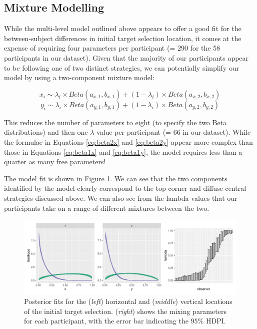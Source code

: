 \documentclass[preprints, article,submit,pdftex,moreauthors]{Definitions/mdpi}
\begin{document}
\subsection{Mixture Modelling}

While the multi-level model outlined above appears to offer a good fit for the between-subject differences in initial target selection location, it comes at the expense of requiring four parameters per participant (= 290 for the 58 participants in our dataset). Given that the majority of our participants appear to be following one of two distinct strategies, we can potentially simplify our model by using a two-component mixture model:

\begin{equation}
    x_i \sim \lambda_i \times Beta(a_{x,1}, b_{x,1}) + (1-\lambda_i) \times Beta(a_{x,2}, b_{x,2})
    \label{eq:beta2x}
\end{equation}
\begin{equation}
    y_i \sim \lambda_i \times Beta(a_{y,1}, b_{y,1}) + (1-\lambda_i) \times Beta(a_{y,2}, b_{y,2})
    \label{eq:beta2y}
\end{equation}

This reduces the number of parameters to eight (to specify the two Beta distributions) and then one $\lambda$ value per participant (= 66 in our dataset). While the formulae in Equations \ref{eq:beta2x} and \ref{eq:beta2y} appear more complex than those in Equations \ref{eq:beta1x} and \ref{eq:beta1y}, the model requires less than a quarter as many free parameters! 

The model fit is shown in Figure \ref{fig:qjep_init2_sel_mdl}. We can see that the two components identified by the model clearly correspond to the top corner and diffuse-central strategies discussed above. We can also see from the lambda values that our participants take on a range of different mixtures between the two. 

\begin{figure}[H]
\centering
\includegraphics[width=\textwidth]{Figures/init_sel2_mdl.pdf}
\caption{Posterior fits for the (\textit{left}) horizontal and (\textit{middle}) vertical locations of the initial target selection. (\textit{right}) shows the mixing parameters for each participant, with the error bar indicating the $95\%$ HDPI.}
\label{fig:qjep_init2_sel_mdl}
\end{figure} 
\end{document}
